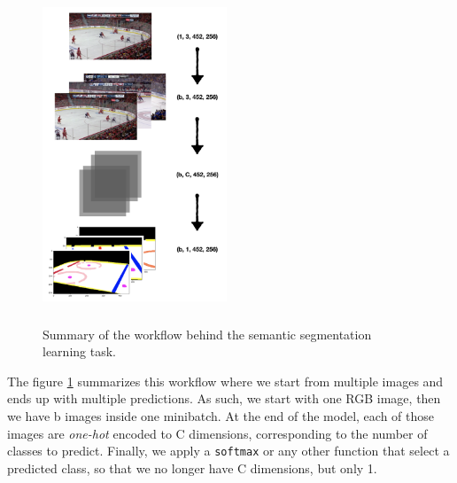 \begin{figure}[H]
	\centering
	\includegraphics[width=5.5cm, height=10cm]{figures/workflow-dimensions.png}
	\caption{Summary of the workflow behind the semantic segmentation learning task.}
	\label{fig:workflow}
\end{figure}

The figure \ref{fig:workflow} summarizes this workflow where we start from multiple images and ends up with multiple predictions. As such, we start with one RGB image, then we have b images inside one minibatch. At the end of the model, each of those images are \textit{one-hot} encoded to C dimensions, corresponding to the number of classes to predict. Finally, we apply a \texttt{softmax} or any other function that select a predicted class, so that we no longer have C dimensions, but only 1.


